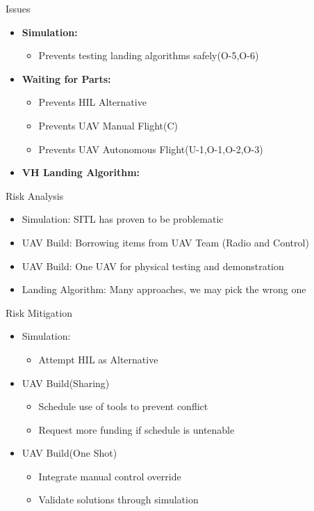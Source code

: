 \documentclass[11pt]{beamer}
\begin{document}
\begin{frame}{Issues}

\begin{itemize}
\item \textbf{Simulation:}\\
\begin{itemize}
\item Prevents testing landing algorithms safely(O-5,O-6)
\end{itemize}
\item \textbf{Waiting for Parts:}\\
\begin{itemize}
\item Prevents HIL Alternative
\item Prevents UAV Manual Flight(C)
\item Prevents UAV Autonomous Flight(U-1,O-1,O-2,O-3)
\end{itemize}
\item \textbf{VH Landing Algorithm:}\\
\end{itemize}

\end{frame}

\begin{frame}{Risk Analysis}
\begin{itemize}
\item Simulation: SITL has proven to be problematic
\item UAV Build: Borrowing items from UAV Team (Radio and Control)
\item UAV Build: One UAV for physical testing and demonstration
\item Landing Algorithm: Many approaches, we may pick the wrong one
\end{itemize}


\end{frame}

\begin{frame}{Risk Mitigation}
\begin{itemize}
\item Simulation:
\begin{itemize}
\item Attempt HIL as Alternative
\end{itemize}

\item UAV Build(Sharing)
\begin{itemize}
\item Schedule use of tools to prevent conflict
\item Request more funding if schedule is untenable
\end{itemize}

\item UAV Build(One Shot)
\begin{itemize}
\item Integrate manual control override
\item Validate solutions through simulation
\end{itemize}

\end{itemize}
\end{frame}
\end{document}
